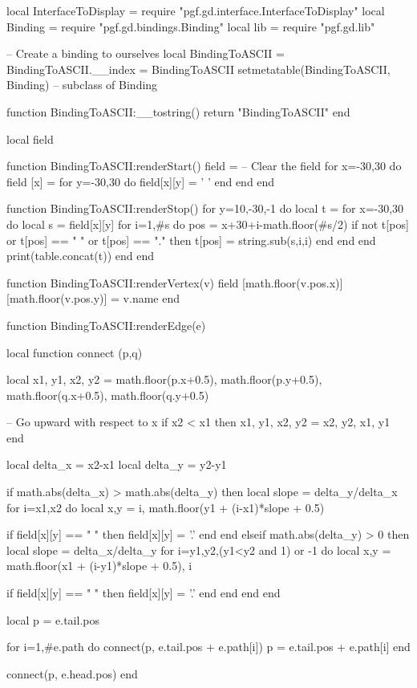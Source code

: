 \label{section-gd-binding-layer-example}

\begin{codeexample}
local InterfaceToDisplay = require "pgf.gd.interface.InterfaceToDisplay"
local Binding = require "pgf.gd.bindings.Binding"
local lib = require "pgf.gd.lib"

-- Create a binding to ourselves
local BindingToASCII = {}
BindingToASCII.__index = BindingToASCII
setmetatable(BindingToASCII, Binding) -- subclass of Binding

function BindingToASCII:__tostring()
  return "BindingToASCII"
end
\end{codeexample}

\begin{codeexample}
local field
  
function BindingToASCII:renderStart()
  field = {}
  -- Clear the field
  for x=-30,30 do
    field [x] = {}
    for y=-30,30 do
      field[x][y] = ' '
    end
  end
end

function BindingToASCII:renderStop()
  for y=10,-30,-1 do
    local t = {}
    for x=-30,30 do
      local s = field[x][y]
      for i=1,#s do
        pos = x+30+i-math.floor(#s/2)
        if not t[pos] or t[pos] == " " or t[pos] == "." then
          t[pos] = string.sub(s,i,i)
        end
      end
    end
    print(table.concat(t))
  end
end

function BindingToASCII:renderVertex(v)
  field [math.floor(v.pos.x)][math.floor(v.pos.y)] = v.name
end
\end{codeexample}

\begin{codeexample}
function BindingToASCII:renderEdge(e)

  local function connect (p,q)

    local x1, y1, x2, y2 = math.floor(p.x+0.5), math.floor(p.y+0.5), math.floor(q.x+0.5), math.floor(q.y+0.5)
    
    -- Go upward with respect to x
    if x2 < x1 then
      x1, y1, x2, y2 = x2, y2, x1, y1
    end
    
    local delta_x = x2-x1
    local delta_y = y2-y1

    if math.abs(delta_x) > math.abs(delta_y) then
      local slope = delta_y/delta_x
      for i=x1,x2 do
        local x,y = i, math.floor(y1 + (i-x1)*slope + 0.5)

        if field[x][y] == " " then
          field[x][y] = '.'
        end
      end
    elseif math.abs(delta_y) > 0 then
      local slope = delta_x/delta_y
      for i=y1,y2,(y1<y2 and 1) or -1 do
        local x,y = math.floor(x1 + (i-y1)*slope + 0.5), i

        if field[x][y] == " " then
          field[x][y] = '.'
        end
      end
    end
  end
  
  
  local p = e.tail.pos
  
  for i=1,#e.path do
    connect(p, e.tail.pos + e.path[i])
    p = e.tail.pos + e.path[i]
  end
  
  connect(p, e.head.pos)
end
\end{codeexample}

